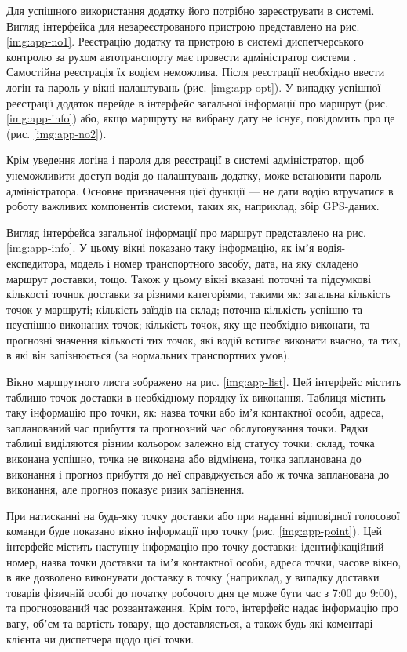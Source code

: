 Для успішного використання додатку його потрібно зареєструвати в системі. Вигляд інтерфейса для незареєстрованого пристрою представлено на рис. \ref{img:app-no1}. Реєстрацію додатку та пристрою в системі диспетчерського контролю за рухом автотранспорту має провести адміністратор системи . Самостійна реєстрація їх водієм неможлива. Після реєстрації необхідно ввести логін та пароль у вікні налаштувань (рис. \ref{img:app-opt}). У випадку успішної реєстрації додаток перейде в інтерфейс загальної інформації про маршрут (рис. \ref{img:app-info}) або, якщо маршруту на вибрану дату не існує, повідомить про це (рис. \ref{img:app-no2}).

Крім уведення логіна і пароля для реєстрації в системі адміністратор, щоб унеможливити доступ водія до налаштувань додатку, може встановити пароль адміністратора. Основне призначення цієї функції --- не дати водію втручатися в роботу важливих компонентів системи, таких як, наприклад, збір GPS-даних.

Вигляд інтерфейса загальної інформації про маршрут представлено на рис. \ref{img:app-info}. У цьому вікні показано таку інформацію, як імʼя водія-експедитора, модель і номер транспортного засобу, дата, на яку складено маршрут доставки, тощо. Також у цьому вікні вказані поточні та підсумкові кількості точнок доставки за різними категоріями, такими як: загальна кількість точок у маршруті; кількість заїздів на склад; поточна кількість успішно та неуспішно виконаних точок; кількість точок, яку ще необхідно виконати, та прогнозні значення кількості тих точок, які водій встигає виконати вчасно, та тих, в які він запізнюється (за нормальних транспортних умов).

Вікно маршрутного листа зображено на рис. \ref{img:app-list}. Цей інтерфейс містить таблицю точок доставки в необхідному порядку їх виконання. Таблиця містить таку інформацію про точки, як: назва точки або імʼя контактної особи, адреса, запланований час прибуття та прогнозний час обслуговування точки. Рядки таблиці виділяются різним кольором залежно від статусу точки: склад, точка виконана успішно, точка не виконана або відмінена, точка запланована до виконання і прогноз прибуття до неї справджується або ж точка запланована до виконання, але прогноз показує ризик запізнення.

При натисканні на будь-яку точку доставки або при наданні відповідної голосової команди буде показано вікно інформації про точку (рис. \ref{img:app-point}). Цей інтерфейс містить наступну інформацію про точку доставки: ідентифікаційний номер, назва точки доставки та імʼя контактної особи, адреса точки, часове вікно, в яке дозволено виконувати доставку в точку (наприклад, у випадку доставки товарів фізичній особі до початку робочого дня це може бути час з 7:00 до 9:00), та прогнозований час розвантаження. Крім того, інтерфейс надає інформацію про вагу, обʼєм та вартість товару, що доставляється, а також будь-які коментарі клієнта чи диспетчера щодо цієї точки.

